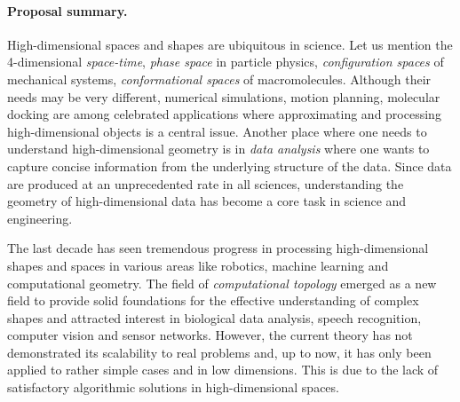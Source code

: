 \documentclass[a4paper, 11pt]{article}
\begin{document}
\paragraph{Proposal summary.} High-dimensional spaces and shapes
are ubiquitous in science.  Let us mention the  4-dimensional {\em space-time},  {\em phase space} in particle physics, {\em configuration spaces} of mechanical systems, {\em conformational spaces} of macromolecules.  Although their needs may be very different, numerical simulations, motion planning, molecular docking are among celebrated applications where approximating and processing high-dimensional objects is a central issue. 
Another place where one needs to understand
high-dimensional geometry is in {\em data analysis} where one wants to
capture concise information from the underlying structure of the data.  %
Since data are produced at an unprecedented rate in all
sciences, understanding the geometry of high-dimensional data %
has become a core task in science and engineering.

The last decade has seen tremendous progress in processing high-dimensional shapes and spaces in various areas like robotics, machine learning and computational geometry.
The field of {\em computational topology} emerged as a new field to provide solid foundations for the effective understanding of complex shapes
%
%
and %
attracted  interest in biological data analysis, speech recognition, computer vision and sensor networks.
However, the current theory has not demonstrated its scalability to
real problems and, up to now, it has only been applied to rather
simple cases and in low dimensions. This is  due to the lack of
satisfactory algorithmic solutions in high-dimensional spaces.
\end{document}
